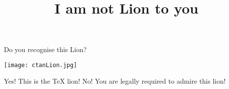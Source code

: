 \documentclass{webquiz}
\title{I am not Lion to you}
\begin{document}
  \begin{question}
    Do you recognise this Lion?
    \begin{center}
        \texttt{[image: ctanLion.jpg]}
    \end{center}
    \begin{choice}
      \correct Yes!  \feedback This is the \TeX{} lion!
      \incorrect No! \feedback You are legally required to admire this lion!
    \end{choice}
  \end{question}
\end{document}
